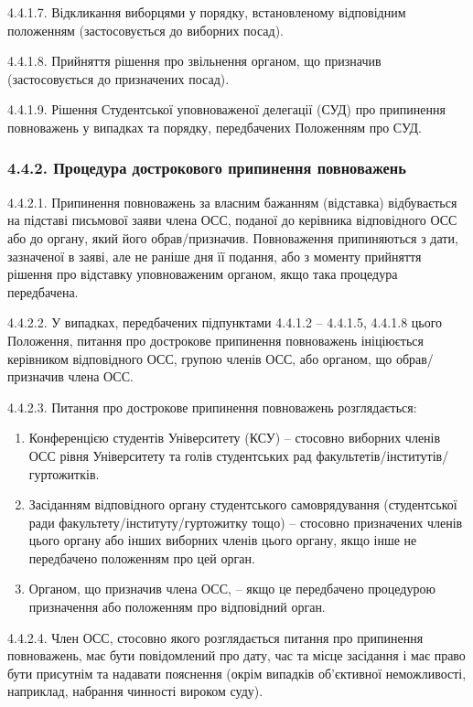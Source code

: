         4.4.1.7. Відкликання виборцями у порядку, встановленому відповідним положенням (застосовується до виборних посад).

        4.4.1.8. Прийняття рішення про звільнення органом, що призначив (застосовується до призначених посад).

        4.4.1.9. Рішення Студентської уповноваженої делегації (СУД) про припинення повноважень у випадках та порядку, передбачених Положенням про СУД.
    \subsubsection*{4.4.2. Процедура дострокового припинення повноважень}
        4.4.2.1. Припинення повноважень за власним бажанням (відставка) відбувається на підставі письмової заяви члена ОСС, поданої до керівника відповідного ОСС або до органу, який його обрав/призначив. Повноваження припиняються з дати, зазначеної в заяві, але не раніше дня її подання, або з моменту прийняття рішення про відставку уповноваженим органом, якщо така процедура передбачена.

        4.4.2.2. У випадках, передбачених підпунктами 4.4.1.2 – 4.4.1.5, 4.4.1.8 цього Положення, питання про дострокове припинення повноважень ініціюється керівником відповідного ОСС, групою членів ОСС, або органом, що обрав/призначив члена ОСС.

        4.4.2.3. Питання про дострокове припинення повноважень розглядається:
            \begin{enumerate}[label=\alph*)]
                \item Конференцією студентів Університету (КСУ) – стосовно виборних членів ОСС рівня Університету та голів студентських рад факультетів/інститутів/гуртожитків.
                \item Засіданням відповідного органу студентського самоврядування (студентської ради факультету/інституту/гуртожитку тощо) – стосовно призначених членів цього органу або інших виборних членів цього органу, якщо інше не передбачено положенням про цей орган.
                \item Органом, що призначив члена ОСС, – якщо це передбачено процедурою призначення або положенням про відповідний орган.
            \end{enumerate}

        4.4.2.4. Член ОСС, стосовно якого розглядається питання про припинення повноважень, має бути повідомлений про дату, час та місце засідання і має право бути присутнім та надавати пояснення (окрім випадків об'єктивної неможливості, наприклад, набрання чинності вироком суду).

